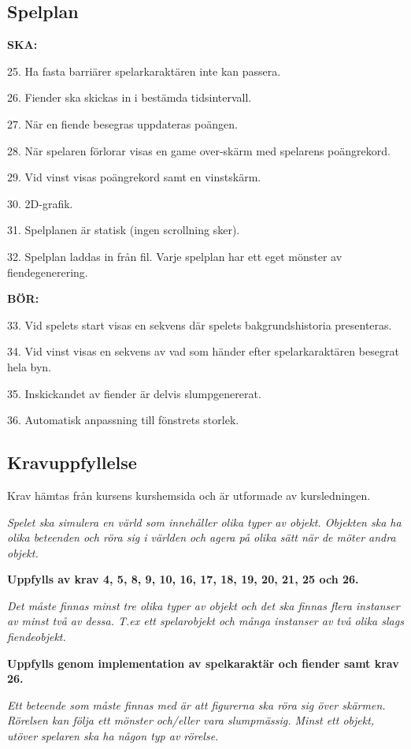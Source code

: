 \documentclass{TDP005mall}
\begin{document}
\subsection{Spelplan}
\textbf{SKA:}

25. Ha fasta barriärer spelarkaraktären inte kan passera. 

26. Fiender ska skickas in i bestämda tidsintervall.

27. När en fiende besegras uppdateras poängen.

28. När spelaren förlorar visas en game over-skärm med spelarens poängrekord.

29. Vid vinst visas poängrekord samt en vinstskärm.

30. 2D-grafik.

31. Spelplanen är statisk (ingen scrollning sker).

32. Spelplan laddas in från fil. Varje spelplan har ett eget mönster av fiendegenerering.

\textbf{BÖR:}

33. Vid spelets start visas en sekvens där spelets bakgrundshistoria presenteras.

34. Vid vinst visas en sekvens av vad som händer efter spelarkaraktären besegrat hela byn.

35. Inskickandet av fiender är delvis slumpgenererat.

36. Automatisk anpassning till fönstrets storlek.

\subsection{Kravuppfyllelse}
Krav hämtas från kursens kurshemsida och är utformade av kursledningen.

\textit{Spelet ska simulera en värld som innehåller olika typer av objekt. Objekten ska ha olika beteenden och röra sig i världen och agera på olika sätt när de möter andra objekt.}

\textbf{Uppfylls av krav 4, 5, 8, 9, 10, 16, 17, 18, 19, 20, 21, 25 och 26.}

\textit{Det måste finnas minst tre olika typer av objekt och det ska finnas flera instanser av minst två av dessa. T.ex ett spelarobjekt och många instanser av två olika slags fiendeobjekt.}

\textbf{Uppfylls genom implementation av spelkaraktär och fiender samt krav 26.}

\textit{Ett beteende som måste finnas med är att figurerna ska röra sig över skärmen. Rörelsen kan följa ett mönster och/eller vara slumpmässig. Minst ett objekt, utöver spelaren ska ha någon typ av rörelse.}
\end{document}
